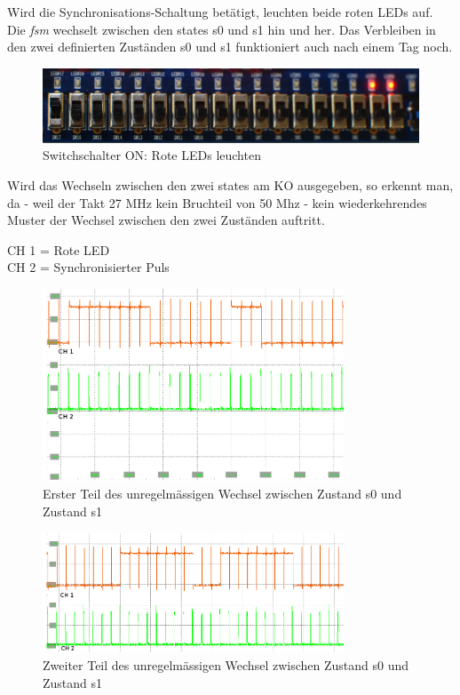 Wird die Synchronisations-Schaltung betätigt, leuchten beide roten LEDs auf. Die \textit{fsm} wechselt zwischen den states s0 und s1 hin und her. Das Verbleiben in den zwei definierten Zuständen s0 und s1 funktioniert auch nach einem Tag noch.

\begin{figure}[H]
	\includegraphics[width=1\textwidth]{images/metastability/synchronized.JPG}
	\caption{Switchschalter ON: Rote LEDs leuchten}
	\label{fig.metastabil.Ergebnis_BoardSynchron}
\end{figure}

\newpage
Wird das Wechseln zwischen den zwei states am KO ausgegeben, so erkennt man, da - weil der Takt 27 MHz kein Bruchteil von 50 Mhz - kein wiederkehrendes Muster der Wechsel zwischen den zwei Zuständen auftritt.

CH 1 = Rote LED\\
CH 2 = Synchronisierter Puls

\begin{figure}[H]
	\includegraphics[width=0.8\textwidth]{images/metastability/synchron_eng_2.png}
	\caption{Erster Teil des unregelmässigen Wechsel zwischen Zustand s0 und Zustand s1}
	\label{fig.metastabil.Ergebnis_1}
\end{figure}

\begin{figure}[H]
	\includegraphics[width=0.8\textwidth]{images/metastability/synchron_eng_3.png}
	\caption{Zweiter Teil des unregelmässigen Wechsel zwischen Zustand s0 und Zustand s1}
	\label{fig.metastabil.Ergebnis_2}
\end{figure}

